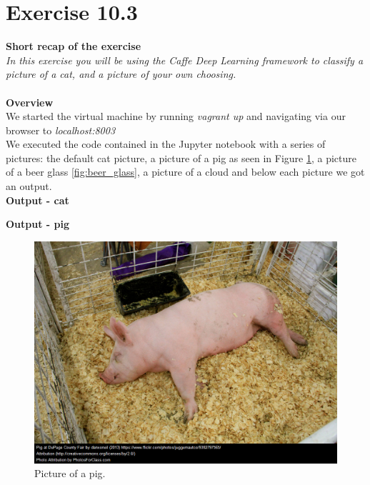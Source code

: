 \documentclass{article}
\begin{document}
\section{Exercise 10.3}
\textbf{Short recap of the exercise}\\
\textit{In this exercise you will be using the Caffe Deep Learning framework to classify a picture of a cat, and a picture of your own choosing.}\\
~\\
\textbf{Overview}\\
We started the virtual machine by running \textit{vagrant up} and navigating via our browser to \textit{localhost:8003}\\
We executed the code contained in the Jupyter notebook with a series of pictures: the default cat picture, a picture of a pig as seen in Figure \ref{fig:pig}, a picture of a beer glass \ref{fig:beer_glass}, a picture of a cloud and below each picture we got an output.
~\\
\textbf{Output - cat}\\
\textbf{Output - pig}
\begin{figure}[h!]
\begin{center}
\caption{Picture of a pig.}
\label{fig:pig}
\includegraphics[scale=0.2]{"../Lesson 10/images/pig"}
\end{center}
\end{figure}
\end{document}

